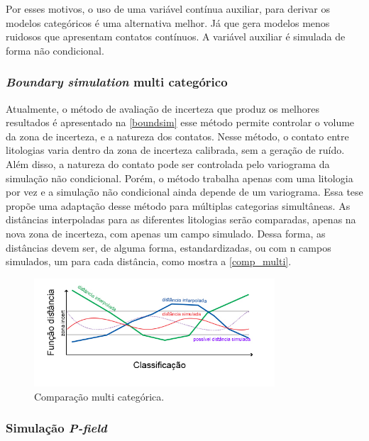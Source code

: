 Por esses motivos, o uso de uma variável contínua auxiliar, para derivar os modelos categóricos é uma alternativa melhor. Já que gera modelos menos ruidosos que apresentam contatos contínuos. A variável auxiliar é simulada de forma não condicional.

\subsubsection{\textit{Boundary simulation} multi categórico}

Atualmente, o método de avaliação de incerteza que produz os melhores resultados é apresentado na \autoref{boundsim} esse método permite controlar o volume da zona de incerteza, e a natureza dos contatos. Nesse método, o contato entre litologias varia dentro da zona de incerteza calibrada, sem a geração de ruído. Além disso, a natureza do contato pode ser controlada pelo variograma da simulação não condicional. Porém, o método trabalha apenas com uma litologia por vez e a simulação não condicional ainda depende de um variograma. Essa tese propõe uma adaptação desse método para múltiplas categorias simultâneas. As distâncias interpoladas para as diferentes litologias serão comparadas, apenas na nova zona de incerteza, com apenas um campo simulado. Dessa forma, as distâncias devem ser, de alguma forma, estandardizadas, ou com n campos simulados, um para cada distância, como mostra a \autoref{comp_multi}.

\begin{figure}[H]
	\caption{\label{comp_multi}Comparação multi categórica.}
	\begin{center}
		\includegraphics[width=0.8\textwidth]{capitulo_3/classificacao_multi.jpg}
	\end{center}
\end{figure}

\subsubsection{Simulação \textit{P-field}}

